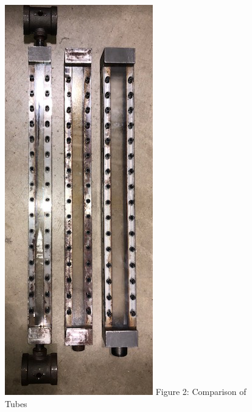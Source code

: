 \documentclass[preview,12pt]{article}
\begin{document}
\begin{figure}[h]
    \begin{center}
        \includegraphics[angle=90, width=\textwidth]{IMG_1044.png}
        \newline Figure 2: Comparison of Tubes
    \end{center}
\end{figure}
\end{document}

